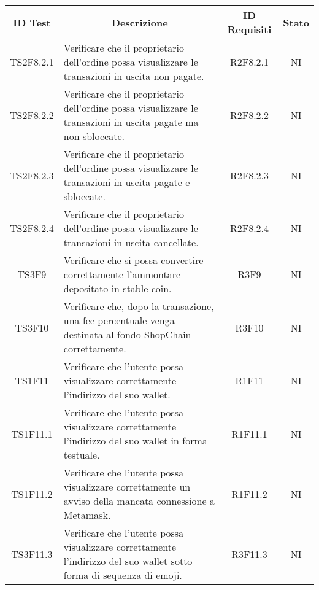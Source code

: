 \begin{table}[H]
  \centering
  \renewcommand{\arraystretch}{1.8}
  \begin{tabular}{c|p{8cm}|c|c}
    \rowcolor[HTML]{125E28}
    \color[HTML]{FFFFFF}\textbf{ID Test}
              & \multicolumn{1}{c}{\color[HTML]{FFFFFF}\textbf{Descrizione}}
              & \color[HTML]{FFFFFF}\textbf{ID Requisiti}
              & \color[HTML]{FFFFFF}\textbf{Stato}                                                                                                          \\
    \hline
    TS2F8.2.1 & Verificare che il proprietario dell'ordine possa visualizzare le transazioni in uscita non pagate.                          & R2F8.2.1 & NI \\
    TS2F8.2.2 & Verificare che il proprietario dell'ordine possa visualizzare le transazioni in uscita pagate ma non sbloccate.             & R2F8.2.2 & NI \\
    TS2F8.2.3 & Verificare che il proprietario dell'ordine possa visualizzare le transazioni in uscita pagate e sbloccate.                  & R2F8.2.3 & NI \\
    TS2F8.2.4 & Verificare che il proprietario dell'ordine possa visualizzare le transazioni in uscita cancellate.                          & R2F8.2.4 & NI \\
    TS3F9     & Verificare che si possa convertire correttamente l'ammontare depositato in stable coin\glo{}.                               & R3F9     & NI \\
    TS3F10    & Verificare che, dopo la transazione, una fee percentuale venga destinata al fondo ShopChain correttamente.                  & R3F10    & NI \\
    TS1F11    & Verificare che l'utente possa visualizzare correttamente l'indirizzo del suo wallet\glo{}.                                  & R1F11    & NI \\
    TS1F11.1  & Verificare che l'utente possa visualizzare correttamente l'indirizzo del suo wallet\glo{} in forma testuale.                & R1F11.1  & NI \\
    TS1F11.2  & Verificare che l'utente possa visualizzare correttamente un avviso della mancata connessione a Metamask\glo{}.              & R1F11.2  & NI \\
    TS3F11.3  & Verificare che l'utente possa visualizzare correttamente l'indirizzo del suo wallet\glo{} sotto forma di sequenza di emoji. & R3F11.3  & NI \\

\end{tabular}
\end{table}
